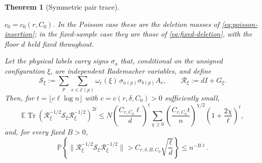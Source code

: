 \documentclass[11pt]{article}
\newtheorem{theorem}{Theorem}[section]
\theoremstyle{definition}
\theoremstyle{remark}
\newcommand{\E}{\mathbb E}
\newcommand{\bbP}{\mathbb P}
\newcommand{\1}{\mathbf 1}
\newcommand{\cR}{\mathcal R}
\newcommand{\cS}{\mathcal S}
\DeclareMathOperator{\Tr}{Tr}
\numberwithin{equation}{section}
\begin{document}
\begin{theorem}[Symmetric pair trace]
\begin{enumerate}[label=\textup{(P\arabic*)}]
$c_0=c_0(r,C_0)$.  In the Poisson case these are the deletion masses
of \cref{eq:poisson-insertion}; in the
fixed-sample case they are those of
\cref{eq:fixed-deletion}, with the floor $d$ held fixed throughout.
\end{enumerate}
Let the physical labels carry signs $\sigma_a$ that, conditional on the
unsigned configuration $\xi$, are independent Rademacher variables, and
define
\begin{equation}\label{eq:packet-operator}
 \cS_\xi:=\sum_p\sum_{e\in\mathcal E(p)}
 \omega_e(\xi)\,\sigma_{a(p)}\sigma_{b(p)}A_e,
 \qquad
 \cR_\xi:=dI+G_\xi.
\end{equation}
Then, for $t=\lfloor c\ell\log n\rfloor$ with
$c=c(r,\delta,C_0)>0$ sufficiently small,
\begin{equation}\label{eq:packet-moment}
 \E\Tr(\cR_\xi^{-1/2}\cS_\xi\cR_\xi^{-1/2})^{2t}
 \le N\left(\frac{C_{r,C_0}\ell}{d}\right)^t
 \sum_{\chi\ge0}
 \left(\frac{C_{r,C_0}t}{n}\right)^{\chi/2}
 \left(1+\frac{2\chi}{\ell}\right)^t,
\end{equation}
and, for every fixed $B>0$,
\begin{equation}\label{eq:packet-tail}
 \bbP\left\{
 \|\cR_\xi^{-1/2}\cS_\xi\cR_\xi^{-1/2}\|
 >C_{r,\delta,B,C_0}\sqrt{\frac\ell d}
 \right\}\le n^{-B\ell}.
\end{equation}
\end{theorem}
\end{document}

